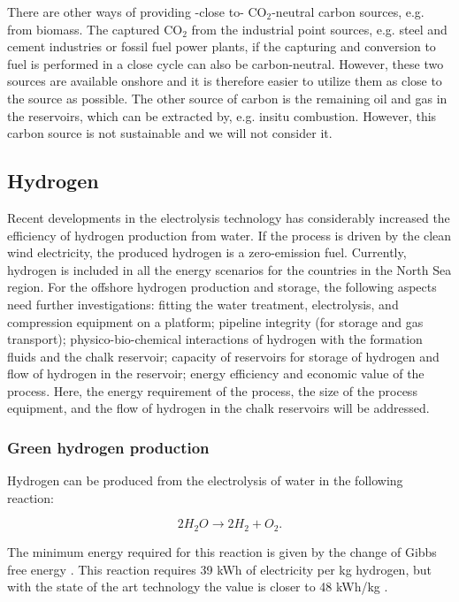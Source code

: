\documentclass{ECOS_2021}
\begin{document}
There are other ways of providing -close to- CO$_{2}$-neutral carbon
sources, e.g. from biomass. The captured CO$_{2}$ from the industrial
point sources, e.g. steel and cement industries or fossil fuel power
plants, if the capturing and conversion to fuel is performed in a
close cycle can also be carbon-neutral. However, these two sources
are available onshore and it is therefore easier to utilize them as
close to the source as possible. The other source of carbon is the
remaining oil and gas in the reservoirs, which can be extracted by,
e.g. insitu combustion. However, this carbon source is not sustainable
and we will not consider it. 

\sffamily \subsection{Hydrogen}
\normalsize
Recent developments in the electrolysis technology has considerably
increased the efficiency of hydrogen production from water. If the
process is driven by the clean wind electricity, the produced hydrogen
is a zero-emission fuel. Currently, hydrogen is included in all the
energy scenarios for the countries in the North Sea region. For the
offshore hydrogen production and storage, the following aspects need
further investigations: fitting the water treatment, electrolysis,
and compression equipment on a platform; pipeline integrity (for storage
and gas transport); physico-bio-chemical interactions of hydrogen
with the formation fluids and the chalk reservoir; capacity of reservoirs
for storage of hydrogen and flow of hydrogen in the reservoir; energy
efficiency and economic value of the process. Here, the energy requirement
of the process, the size of the process equipment, and the flow of
hydrogen in the chalk reservoirs will be addressed. 

\sffamily \subsubsection{Green hydrogen production }
\normalsize
Hydrogen can be produced from the electrolysis of water in the following
reaction: 

\[
2H_{2}O\rightarrow2H_{2}+O_{2}.
\]

The minimum energy required for this reaction is given by the change
of Gibbs free energy \cite{rosenEnergyExergyAnalyses1995}. This reaction
requires 39 kWh of electricity per kg hydrogen, but with the state
of the art technology the value is closer to 48 kWh/kg \cite{gardnerHydrogenProductionRenewables2009,ozarslanLargescaleHydrogenEnergy2012}.
\end{document}
